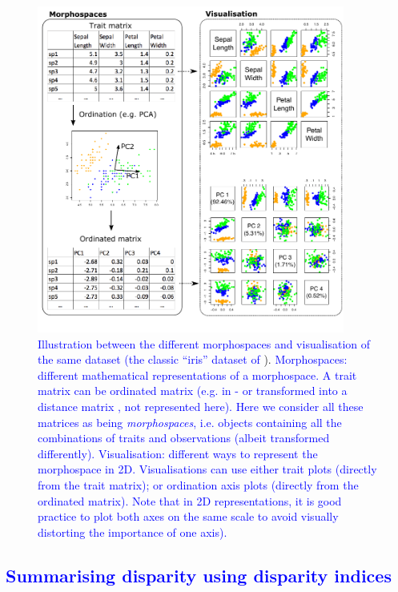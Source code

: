\documentclass[12pt,letterpaper]{article}
\begin{document}
\begin{figure}[!htbp]
\centering
   \includegraphics[width=0.9\textwidth]{Figures/figure_space2.pdf}
\caption{
    \textcolor{blue}{Illustration between the different morphospaces and visualisation of the same dataset (the classic ``iris'' dataset of} \citealt{edgar1935irises,fisher1936use}).
    \textcolor{blue}{Morphospaces: different mathematical representations of a morphospace. A trait matrix can be ordinated matrix (e.g. in }\citealt{tyler2011detecting}\textcolor{blue}{ - or transformed into a distance matrix }\citealt{Close2015}\textcolor{blue}{, not represented here).}
    \textcolor{blue}{Here we consider all these matrices as being \textit{morphospaces}, i.e. objects containing all the combinations of traits and observations (albeit transformed differently).
    Visualisation: different  ways to represent the morphospace in 2D.
    Visualisations can use either trait plots (directly from the trait matrix); or ordination axis plots (directly from the ordinated matrix).
    Note that in 2D representations, it is good practice to plot both axes on the same scale to avoid visually distorting the importance of one axis).}
}
\label{Fig:morphospace}
\end{figure}

\textcolor{blue}{\subsection{Summarising disparity using disparity indices} \label{section:metrics}}
\end{document}
